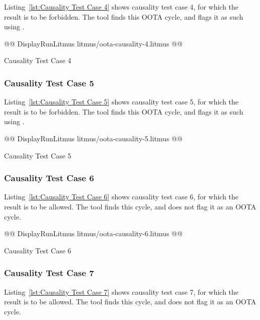 \documentclass[10]{article}
\begin{document}
Listing~\ref{lst:Causality Test Case 4}
shows causality test case 4, for which the  result
is to be forbidden.
The  tool finds this OOTA cycle, and flags it as such using .

\begin{listing}[tbp]
@@ DisplayRunLitmus litmus/oota-causality-4.litmus @@
\caption{Causality Test Case 4}
\label{lst:Causality Test Case 4}
\end{listing}

\subsubsection{Causality Test Case 5}
\label{app:Causality Test Case 5}

Listing~\ref{lst:Causality Test Case 5}
shows causality test case 5, for which the 
result is to be forbidden.
The  tool finds this OOTA cycle, and flags it as such using .

\begin{listing}[tbp]
@@ DisplayRunLitmus litmus/oota-causality-5.litmus @@
\caption{Causality Test Case 5}
\label{lst:Causality Test Case 5}
\end{listing}

\subsubsection{Causality Test Case 6}
\label{app:Causality Test Case 6}

Listing~\ref{lst:Causality Test Case 6}
shows causality test case 6, for which the 
result is to be allowed.
The  tool finds this cycle, and does not flag it as an OOTA cycle.

\begin{listing}[tbp]
@@ DisplayRunLitmus litmus/oota-causality-6.litmus @@
\caption{Causality Test Case 6}
\label{lst:Causality Test Case 6}
\end{listing}

\subsubsection{Causality Test Case 7}
\label{app:Causality Test Case 7}

Listing~\ref{lst:Causality Test Case 7}
shows causality test case 7, for which the 
result is to be allowed.
The  tool finds this cycle, and does not flag it as an OOTA cycle.
\end{document}
